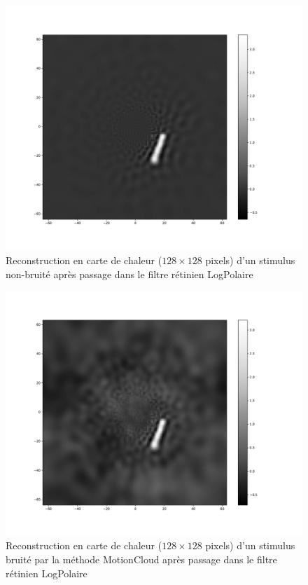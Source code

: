 \begin{figure}[th]
\centering
\includegraphics[scale=0.4]{Figures/mnist_128_LP_nonoise}
\decoRule
\caption[Figure]{Reconstruction en carte de chaleur ($128\times 128$ pixels) d'un stimulus non-bruité après passage dans le filtre rétinien LogPolaire}
\label{fig:mnist_128_LP_nonoise}
\end{figure}

\begin{figure}[th]
\centering
\includegraphics[scale=0.4]{Figures/mnist_128_LP_noise}
\decoRule
\caption[Figure]{Reconstruction en carte de chaleur ($128\times 128$ pixels) d'un stimulus bruité par la méthode MotionCloud après passage dans le filtre rétinien LogPolaire}
\label{fig:mnist_128_LP_MotionCloud}
\end{figure}


